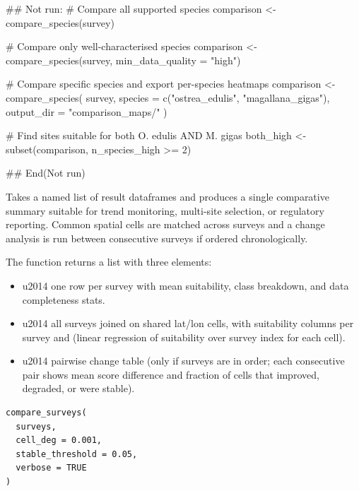 \documentclass[a4paper]{book}
\begin{document}
\begin{Examples}
\begin{ExampleCode}
## Not run: 
# Compare all supported species
comparison <- compare_species(survey)

# Compare only well-characterised species
comparison <- compare_species(survey, min_data_quality = "high")

# Compare specific species and export per-species heatmaps
comparison <- compare_species(
  survey,
  species    = c("ostrea_edulis", "magallana_gigas"),
  output_dir = "comparison_maps/"
)

# Find sites suitable for both O. edulis AND M. gigas
both_high <- subset(comparison, n_species_high >= 2)

## End(Not run)
\end{ExampleCode}
\end{Examples}
%
\begin{Description}
Takes a named list of  result dataframes and produces a
single comparative summary suitable for trend monitoring, multi-site
selection, or regulatory reporting. Common spatial cells are matched across
surveys and a change analysis is run between consecutive surveys if ordered
chronologically.

The function returns a list with three elements:
\begin{itemize}

\item{}  \bsl{}u2014 one row per survey with mean suitability, class breakdown,
and data completeness stats.
\item{}  \bsl{}u2014 all surveys joined on shared lat/lon cells, with suitability
columns per survey and  (linear regression of suitability
over survey index for each cell).
\item{}  \bsl{}u2014 pairwise change table (only if surveys are in order; each
consecutive pair shows mean score difference and fraction of cells
that improved, degraded, or were stable).

\end{itemize}

\end{Description}
%
\begin{Usage}
\begin{verbatim}
compare_surveys(
  surveys,
  cell_deg = 0.001,
  stable_threshold = 0.05,
  verbose = TRUE
)
\end{verbatim}
\end{Usage}
\end{document}
